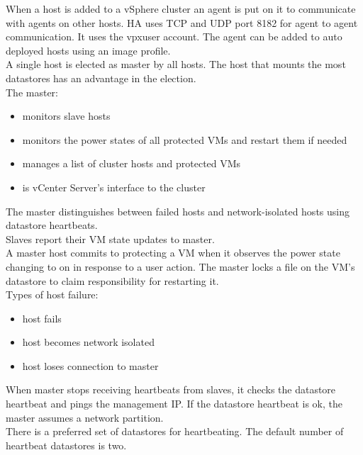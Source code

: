 When a host is added to a vSphere cluster an agent is put on it to
communicate with agents on other hosts. HA uses TCP and UDP port 8182 for
agent to agent communication. It uses the vpxuser account. The agent can
be added to auto deployed hosts using an image profile.\\

A single host is elected as master by all hosts. The host that mounts the
most datastores has an advantage in the election.\\

The master:

\begin{itemize}
\item monitors slave hosts
\item monitors the power states of all protected VMs and restart them if needed
\item manages a list of cluster hosts and protected VMs
\item is vCenter Server's interface to the cluster
\end{itemize}

The master distinguishes between failed hosts and network-isolated hosts using
datastore heartbeats.\\

Slaves report their VM state updates to master.\\

A master host commits to protecting a VM when it observes the power state
changing to on in response to a user action. The master locks a file on the
VM's datastore to claim responsibility for restarting it.\\

Types of host failure:

\begin{itemize}
\item host fails
\item host becomes network isolated
\item host loses connection to master
\end{itemize}

When master stops receiving heartbeats from slaves, it checks the datastore
heartbeat and pings the management IP. If the datastore heartbeat is ok, the
master assumes a network partition.\\

There is a preferred set of datastores for heartbeating. The default number
of heartbeat datastores is two.\\

